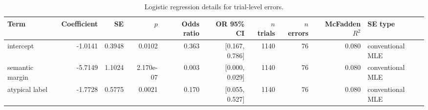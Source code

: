 \begin{table}[htbp]
\centering
\small
\caption{Logistic regression details for trial-level errors.}
\label{tab:error-logistic-details}
\begin{tabular}{lrrrrrrrrl}
\toprule
Term & Coefficient & SE & $p$ & Odds ratio & OR 95\% CI & $n$ trials & $n$ errors & McFadden $R^2$ & SE type \\
\midrule
intercept & -1.0141 & 0.3948 & 0.0102 & 0.363 & [0.167, 0.786] & 1140 & 76 & 0.080 & conventional MLE \\
semantic margin & -5.7149 & 1.1024 & 2.170e-07 & 0.003 & [0.000, 0.029] & 1140 & 76 & 0.080 & conventional MLE \\
atypical label & -1.7728 & 0.5775 & 0.0021 & 0.170 & [0.055, 0.527] & 1140 & 76 & 0.080 & conventional MLE \\
\bottomrule
\end{tabular}
\end{table}
